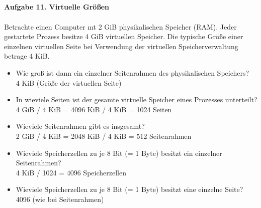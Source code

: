 \documentclass{article}
\begin{document}
\subsection*{}
\textbf{Aufgabe 11. Virtuelle Größen} \\ \\
Betrachte einen Computer mt 2 GiB physikalischen Speicher (RAM). Jeder gestartete Prozess besitze 4 GiB virtuellen Speicher. Die typische Größe einer einzelnen virtuellen Seite bei Verwendung der virtuellen Speicherverwaltung betrage 4 KiB.
\begin{itemize}
  \item {Wie groß ist dann ein einzelner Seitenrahmen des physikalischen Spei\-chers?} \\
  4 KiB (Größe der virtuellen Seite)
  \item {In wieviele Seiten ist der gesamte virtuelle Speicher eines Prozesses unterteilt?} \\
  4 GiB / 4 KiB = 4096 KiB / 4 KiB = 1024 Seiten
  \item {Wieviele Seitenrahmen gibt es insgesamt?} \\
  2 GiB / 4 KiB = 2048 KiB / 4 KiB = 512 Seitenrahmen
  \item {Wieviele Speicherzellen zu je 8 Bit (= 1 Byte) besitzt ein einzelner Seitenrahmen?} \\
  4 KiB / 1024 = 4096 Speicherzellen
  \item {Wieviele Speicherzellen zu je 8 Bit (= 1 Byte) besitzt eine einzelne Seite?}
  4096 (wie bei Seitenrahmen)
\end{itemize}
\end{document}
